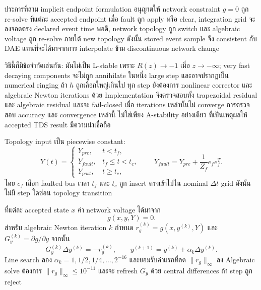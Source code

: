 \documentclass[12pt,a4paper]{article}
\begin{document}
ประการที่สาม implicit endpoint formulation อนุญาตให้ network constraint $g=0$ ถูก re-solve ที่แต่ละ accepted endpoint เมื่อ fault ถูก apply หรือ clear, integration grid จะลงจอดตรง declared event time พอดี, network topology ถูก switch และ algebraic voltage ถูก re-solve ภายใต้ new topology ดังนั้น stored event sample จึง consistent กับ DAE แทนที่จะได้มาจากการ interpolate ข้าม discontinuous network change

วิธีนี้ก็มีข้อจำกัดเช่นกัน: มันไม่เป็น L-stable เพราะ $R(z)\rightarrow-1$ เมื่อ $z\rightarrow-\infty$; very fast decaying components จะไม่ถูก annihilate ในหนึ่ง large step และอาจปรากฏเป็น numerical ringing ถ้า $h$ ถูกเลือกใหญ่เกินไป ทุก step ยังต้องการ nonlinear corrector และ algebraic Newton iterations ด้วย Implementation จึงตรวจสอบทั้ง trapezoidal residual และ algebraic residual และจะ fail-closed เมื่อ iterations เหล่านั้นไม่ converge การตรวจสอบ accuracy และ convergence เหล่านี้ ไม่ใช่เพียง A-stability อย่างเดียว ที่เป็นเหตุผลให้ accepted TDS result มีความน่าเชื่อถือ

Topology input เป็น piecewise constant:
\begin{equation}
Y(t)=
\begin{cases}
Y_{pre},&t<t_f,\\
Y_{fault},&t_f\le t<t_c,\\
Y_{post},&t\ge t_c,
\end{cases}
\qquad
Y_{fault}=Y_{pre}+\frac{1}{Z_f}e_fe_f^T.
\label{eq:ts-topology}
\end{equation}
โดย $e_f$ เลือก faulted bus เวลา $t_f$ และ $t_c$ ถูก insert ตรงเข้าไปใน nominal $\Delta t$ grid ดังนั้นไม่มี step ใดซ่อน topology transition

ที่แต่ละ accepted state $x$ ค่า network voltage ได้มาจาก
\begin{equation}
g(x,y,Y)=0.
\label{eq:ts-algebraic}
\end{equation}
สำหรับ algebraic Newton iteration $k$ กำหนด $r_g^{(k)}=g(x,y^{(k)},Y)$ และ $G_y^{(k)}=\partial g/\partial y$ จากนั้น
\begin{equation}
G_y^{(k)}\Delta y^{(k)}=-r_g^{(k)},\qquad
y^{(k+1)}=y^{(k)}+\alpha_k\Delta y^{(k)}.
\label{eq:ts-network-newton}
\end{equation}
Line search ลอง $\alpha_k=1,1/2,1/4,\ldots,2^{-16}$ และยอมรับค่าแรกที่ลด $\|r_g\|_\infty$ ลง Algebraic solve ต้องการ $\|r_g\|_\infty\le10^{-11}$ และจะ refresh $G_y$ ด้วย central differences ถ้า step ถูก reject
\end{document}
